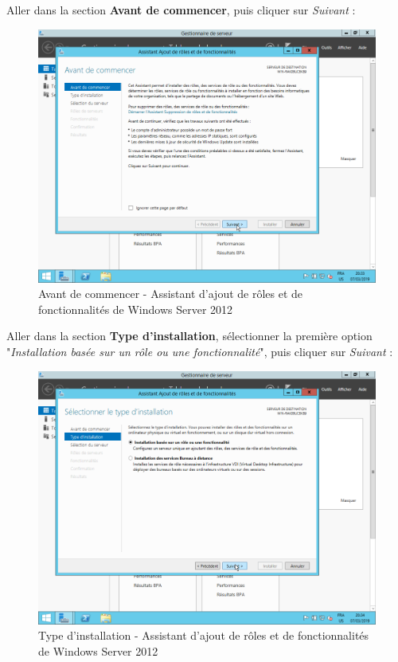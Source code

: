 \newpage
Aller dans la section \textbf{Avant de commencer}, puis cliquer sur \textit{Suivant} :
\begin{figure}[h!]
    \begin{center}
        \includegraphics[scale=0.6]{WS2012_Screenshots/18.png}
        \caption{Avant de commencer - Assistant d'ajout de rôles et de fonctionnalités de Windows Server 2012}
        \label{WS2012_Screenshots/18}
    \end{center}
\end{figure}
\FloatBarrier

\newpage
Aller dans la section \textbf{Type d'installation}, sélectionner la première option "\textit{Installation basée sur un rôle ou une fonctionnalité}", puis cliquer sur \textit{Suivant} :
\begin{figure}[h!]
    \begin{center}
        \includegraphics[scale=0.6]{WS2012_Screenshots/19.png}
        \caption{Type d'installation - Assistant d'ajout de rôles et de fonctionnalités de Windows Server 2012}
        \label{WS2012_Screenshots/19}
    \end{center}
\end{figure}
\FloatBarrier

